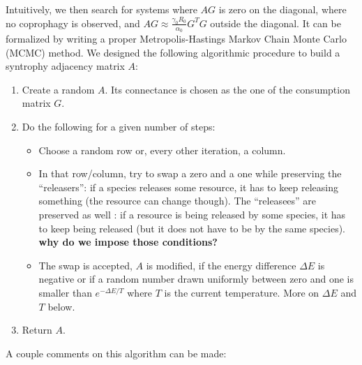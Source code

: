 \documentclass[12pt, titlepage]{report}
\begin{document}
Intuitively, we then search for systems where $AG$ is zero on the diagonal, \ie where no coprophagy is observed, and $AG \approx \frac{\gamma_0R_0}{\alpha_0}G^TG$ outside the diagonal. It can be formalized by writing a proper Metropolis-Hastings Markov Chain Monte Carlo (MCMC) method. We designed the following algorithmic procedure to build a syntrophy adjacency matrix $A$:
\begin{enumerate}
\item Create a random $A$. Its connectance is chosen as the one of the consumption matrix $G$.
\item Do the following for a given number of steps:
\begin{itemize}
\item Choose a random row or, every other iteration, a column.
\item In that row/column, try to swap a zero and a one while preserving the ``releasers'': if a species releases some resource, it has to keep releasing something (the resource can change though). The ``releasees'' are preserved as well : if a resource is being released by some species, it has to keep being released (but it does not have to be by the same species). \textbf{why do we impose those conditions?}
\item The swap is accepted, \ie $A$ is modified, if the energy difference $\Delta E$ is negative or if a random number drawn uniformly between zero and one is smaller than $e^{-\Delta E/T}$ where $T$ is the current temperature. More on $\Delta E$ and $T$ below.
\end{itemize}
\item Return $A$.
\end{enumerate}
A couple comments on this algorithm can be made:
\end{document}
